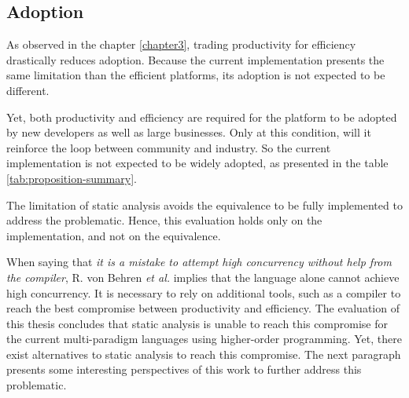 

\subsection{Adoption}

As observed in the chapter \ref{chapter3}, trading productivity for efficiency drastically reduces adoption.
Because the current implementation presents the same limitation than the efficient platforms, its adoption is not expected to be different. %

Yet, both productivity and efficiency are required for the platform to be adopted by new developers as well as large businesses.
Only at this condition, will it reinforce the loop between community and industry.
So the current implementation is not expected to be widely adopted, as presented in the table \ref{tab:proposition-summary}.



The limitation of static analysis avoids the equivalence to be fully implemented to address the problematic.
Hence, this evaluation holds only on the implementation, and not on the equivalence.


When saying that \textit{it is a mistake to attempt high concurrency without help from the compiler}, R. von Behren \textit{et al.} \cite{Behren2003} implies that the language alone cannot achieve high concurrency.
It is necessary to rely on additional tools, such as a compiler to reach the best compromise between productivity and efficiency.
The evaluation of this thesis concludes that static analysis is unable to reach this compromise for the current multi-paradigm languages using higher-order programming.
Yet, there exist alternatives to static analysis to reach this compromise.
The next paragraph presents some interesting perspectives of this work to further address this problematic.

